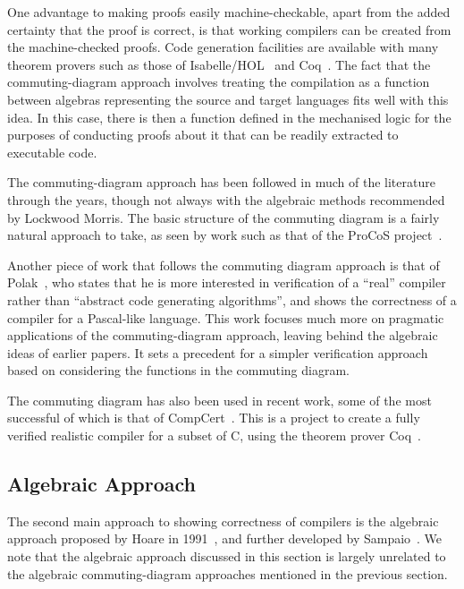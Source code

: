 \documentclass[a4paper,10pt]{report}
\begin{document}
One advantage to making proofs easily machine-checkable, apart from the added
certainty that the proof is correct, is that working compilers can be created
from the machine-checked proofs.  Code generation facilities are available with
many theorem provers such as those of Isabelle/HOL~\cite{haftmann2007} and
Coq~\cite{letouzey2003, letouzey2008}. The fact that the commuting-diagram
approach involves treating the compilation as a function between algebras
representing the source and target languages fits well with this idea. In this
case, there is then a function defined in the mechanised logic for the purposes
of conducting proofs about it that can be readily extracted to executable code.

The commuting-diagram approach has been followed in much of the literature
through the years, though not always with the algebraic methods recommended by
Lockwood Morris.  The basic structure of the commuting diagram is a fairly
natural approach to take, as seen by work such as that of the ProCoS
project~\cite{buth1992}.

Another piece of work that follows the commuting diagram approach is that of
Polak~\cite{polak1981}, who states that he is more interested in verification of
a ``real'' compiler rather than ``abstract code generating algorithms'', and
shows the correctness of a compiler for a Pascal-like language.  This work
focuses much more on pragmatic applications of the commuting-diagram approach,
leaving behind the algebraic ideas of earlier papers.  It sets a precedent for a
simpler verification approach based on considering the functions in the
commuting diagram.

The commuting diagram has also been used in recent work, some of the most
successful of which is that of CompCert~\cite{leroy2009a, leroy2009b,
  leroy2012}.  This is a project to create a fully verified realistic compiler
for a subset of C, using the theorem prover Coq~\cite{coq2004}.

\subsection{Algebraic Approach}
\label{algebraic-approach-subsection}

The second main approach to showing correctness of compilers is the
algebraic approach proposed by Hoare in 1991~\cite{hoare1991}, and
further developed by Sampaio~\cite{hoare1993, sampaio1993,
  sampaio1997}. We note that the algebraic approach discussed in this
section is largely unrelated to the algebraic commuting-diagram
approaches mentioned in the previous section.
\end{document}
